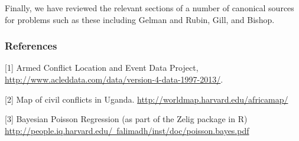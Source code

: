 \documentclass{article} %
\begin{document}
Finally, we have reviewed the relevant sections of a number of canonical sources for problems such as these including Gelman and Rubin, Gill, and Bishop.


\subsubsection*{References}

\small{
[1] Armed Conflict Location and Event Data Project, \href{http://www.acleddata.com/data/version-4-data-1997-2013/}{http://www.acleddata.com/data/version-4-data-1997-2013/}.

[2] Map of civil conflicts in Uganda. \href{http://worldmap.harvard.edu/africamap/}{http://worldmap.harvard.edu/africamap/}
}

[3] Bayesian Poisson Regression (as part of the Zelig package in R) \href{http://people.iq.harvard.edu/~falimadh/inst/doc/poisson.bayes.pdf}{http://people.iq.harvard.edu/~falimadh/inst/doc/poisson.bayes.pdf}
\end{document}
